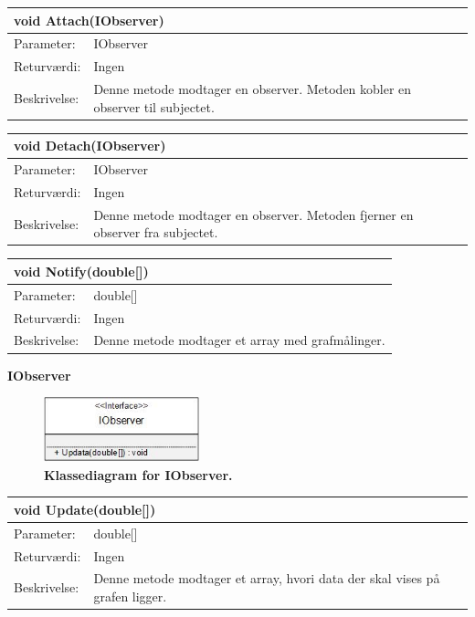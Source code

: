 \begin{table}[H]
\label{tab:tabel2}
\begin{tabular}{| l | p{13cm} |}
   \hline
   \multicolumn{2}{|l|}{void Attach(IObserver)} \\ \hline
   Parameter: & IObserver\\ \hline
   Returværdi: & Ingen \\ \hline
   Beskrivelse: & Denne metode modtager en observer. Metoden kobler en observer til subjectet.\\ \hline
\end{tabular}
\end{table}
\begin{table}[H]
\label{tab:tabel2}
\begin{tabular}{| l | p{13cm} |}
   \hline
   \multicolumn{2}{|l|}{void Detach(IObserver)} \\ \hline
   Parameter: & IObserver\\ \hline
   Returværdi: & Ingen \\ \hline
   Beskrivelse: & Denne metode modtager en observer. Metoden fjerner en observer fra subjectet.\\ \hline
\end{tabular}
\end{table}
\begin{table}[H]
\label{tab:tabel2}
\begin{tabular}{| l | p{13cm} |}
   \hline
   \multicolumn{2}{|l|}{void Notify(double[])} \\ \hline
   Parameter: & double[]\\ \hline
   Returværdi: & Ingen \\ \hline
   Beskrivelse: & Denne metode modtager et array med grafmålinger.\\ \hline
\end{tabular}
\end{table}
\textbf{IObserver}
\begin{figure}[H]
\includegraphics[width =0.4\textwidth , center]{billeder/klassediagramIobserver}
\caption{\textbf{Klassediagram for IObserver.}}
\end{figure}
\begin{table}[H]
\label{tab:tabel2}
\begin{tabular}{| l | p{13cm} |}
   \hline
   \multicolumn{2}{|l|}{void Update(double[])} \\ \hline
   Parameter: & double[]\\ \hline
   Returværdi: & Ingen \\ \hline
   Beskrivelse: & Denne metode modtager et array, hvori data der skal vises på grafen ligger.\\ \hline
\end{tabular}
\end{table}
